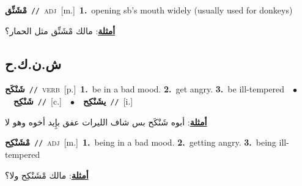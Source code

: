 \documentclass[10pt,a4paper,twoside]{article} %
\begin{document}
\begin{multicols}{2}
{\setlength\topsep{0pt}\textbf{\foreignlanguage{arabic}{مْشَنِّق}}\ {\color{gray}\texttt{//}\color{black}}\ \textsc{adj}\ [m.]\ \textbf{1.}~opening sb's mouth widely (usually used for donkeys)\  \begin{flushright}\color{gray}\foreignlanguage{arabic}{\textbf{\underline{\foreignlanguage{arabic}{أمثلة}}}: مالك مْشَنِّق مثل الحمار؟}\end{flushright}\color{black}} \vspace{2mm}

\vspace{-3mm}
\subsection*{\color{blue}\foreignlanguage{arabic}{ش.ن.ك.ح}\color{blue}{}} 

{\setlength\topsep{0pt}\textbf{\foreignlanguage{arabic}{شَنْكَح}}\ {\color{gray}\texttt{//}\color{black}}\ \textsc{verb}\ [p.]\ \textbf{1.}~be in a bad mood.  \textbf{2.}~get angry.  \textbf{3.}~be ill-tempered\ \ $\bullet$\ \ \setlength\topsep{0pt}\textbf{\foreignlanguage{arabic}{شَنْكِح}}\ {\color{gray}\texttt{//}\color{black}}\ [c.]\ \ $\bullet$\ \ \setlength\topsep{0pt}\textbf{\foreignlanguage{arabic}{يشَنْكِح}}\ {\color{gray}\texttt{//}\color{black}}\ [i.]\  \begin{flushright}\color{gray}\foreignlanguage{arabic}{\textbf{\underline{\foreignlanguage{arabic}{أمثلة}}}: أبوه شَنْكَح بس شاف الليرات عفق بإِيد أخوه وهو لا}\end{flushright}\color{black}} \vspace{2mm}

{\setlength\topsep{0pt}\textbf{\foreignlanguage{arabic}{مْشَنْكِح}}\ {\color{gray}\texttt{//}\color{black}}\ \textsc{adj}\ [m.]\ \textbf{1.}~being in a bad mood.  \textbf{2.}~getting angry.  \textbf{3.}~being ill-tempered\  \begin{flushright}\color{gray}\foreignlanguage{arabic}{\textbf{\underline{\foreignlanguage{arabic}{أمثلة}}}: مالك مْشَنْكِح ولا؟}\end{flushright}\color{black}} \vspace{2mm}


\end{multicols}
\end{document}
